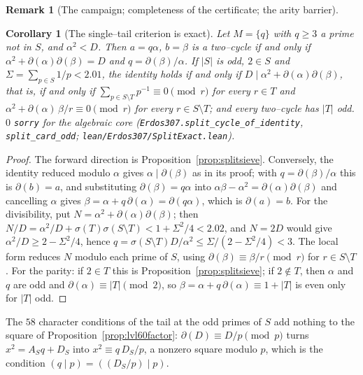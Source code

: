\documentclass[11pt]{article}
\newtheorem{corollary}[theorem]{Corollary}
\theoremstyle{definition}
\newtheorem{remark}[theorem]{Remark}
\begin{document}
\begin{remark}[The campaign; completeness of the certificate; the arity barrier]
\begin{corollary}[The single--tail criterion is exact]\label{cor:splitexact}
Let $M=\{q\}$ with $q\ge3$ a prime not in $S$, and $\alpha^{2}<D$. Then $a=q\alpha$, $b=\beta$ is a two--cycle if and only if
$\alpha^{2}+\partial(\alpha)\partial(\beta)=D$ and $q=\partial(\beta)/\alpha$. If $|S|$ is odd, $2\in S$ and
$\Sigma=\sum_{p\in S}1/p<2.01$, the identity holds if and only if $D\mid\alpha^{2}+\partial(\alpha)\partial(\beta)$, that is, if
and only if $\sum_{p\in S\setminus T}p^{-1}\equiv0\pmod r$ for every $r\in T$ and
$\alpha^{2}+\partial(\alpha)\,\beta/r\equiv0\pmod r$ for every $r\in S\setminus T$; and every two--cycle has $|T|$ odd.
$0$ \texttt{sorry} for the algebraic core \textup{(\texttt{Erdos307.split\_cycle\_of\_identity},
\texttt{split\_card\_odd}; \texttt{lean/Erdos307/SplitExact.lean})}.
\end{corollary}
\begin{proof}
The forward direction is Proposition~\ref{prop:splitsieve}. Conversely, the identity reduced modulo $\alpha$ gives
$\alpha\mid\partial(\beta)$ as in its proof; with $q=\partial(\beta)/\alpha$ this is $\partial(b)=a$, and substituting
$\partial(\beta)=q\alpha$ into $\alpha\beta-\alpha^{2}=\partial(\alpha)\partial(\beta)$ and cancelling $\alpha$ gives
$\beta=\alpha+q\,\partial(\alpha)=\partial(q\alpha)$, which is $\partial(a)=b$. For the divisibility, put
$N=\alpha^{2}+\partial(\alpha)\partial(\beta)$; then $N/D=\alpha^{2}/D+\sigma(T)\sigma(S\setminus T)<1+\Sigma^{2}/4<2.02$, and
$N=2D$ would give $\alpha^2/D\ge2-\Sigma^2/4$, hence $q=\sigma(S\setminus T)D/\alpha^{2}\le\Sigma/(2-\Sigma^{2}/4)<3$. The local
form reduces $N$ modulo each prime of $S$, using $\partial(\beta)\equiv\beta/r\pmod r$ for $r\in S\setminus T$. For the parity:
if $2\in T$ this is Proposition~\ref{prop:splitsieve}; if $2\notin T$, then $\alpha$ and $q$ are odd and
$\partial(\alpha)\equiv|T|\pmod2$, so $\beta=\alpha+q\,\partial(\alpha)\equiv1+|T|$ is even only for $|T|$ odd.
\end{proof}

The $58$ character conditions of the tail at the odd primes of $S$ add nothing to the square of
Proposition~\ref{prop:lvl60factor}: $\partial(D)\equiv D/p\pmod p$ turns $x^{2}=A_Sq+D_S$ into $x^{2}\equiv q\,D_S/p$, a nonzero
square modulo $p$, which is the condition $(q\mid p)=((D_S/p)\mid p)$.


\end{remark}
\end{document}
